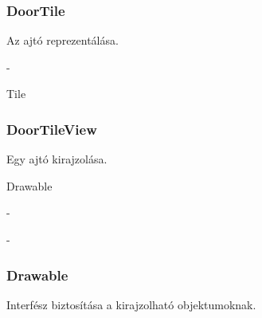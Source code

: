 \subsubsection{DoorTile}
\begin{class-template-responsibility}
    Az ajtó reprezentálása. 
\end{class-template-responsibility}
\begin{class-template-interface}
    -
\end{class-template-interface}
\begin{class-template-baseclass}
    Tile
\end{class-template-baseclass}
\begin{class-template-attribute}
\end{class-template-attribute}
\begin{class-template-method}
\end{class-template-method}

\subsubsection{DoorTileView}
\begin{class-template-responsibility}
    Egy ajtó kirajzolása.
\end{class-template-responsibility}
\begin{class-template-interface}
    Drawable
\end{class-template-interface}
\begin{class-template-baseclass}
    -
\end{class-template-baseclass}
\begin{class-template-attribute}
\end{class-template-attribute}
\begin{class-template-method}
    -
\end{class-template-method}

\subsubsection{Drawable}
\begin{class-template-responsibility}
    Interfész biztosítása a kirajzolható objektumoknak.
\end{class-template-responsibility}
\begin{class-template-method}
\end{class-template-method}


